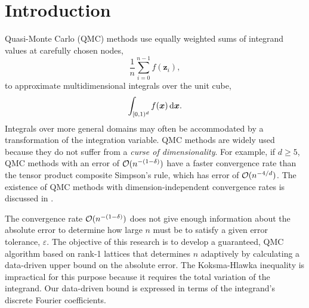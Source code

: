 \documentclass[graybox]{svmult}
\newcommand{\bsx}{\boldsymbol{x}}    %
\newcommand{\bsz}{\boldsymbol{z}}    %
\begin{document}

\section{Introduction}

Quasi-Monte Carlo (QMC) methods use equally weighted sums of integrand values at carefully chosen nodes,
\[
\frac 1n \sum_{i=0}^{n-1} f(\bsz_i), 
\]
to approximate multidimensional integrals over the unit cube,
\[
\int_{\cube} f(\bsx) \, \dif \bsx.
\]
Integrals over more general domains may often be accommodated by a transformation of the integration variable. QMC methods are widely used because they do not suffer from a \textit{curse of dimensionality}. For example, if $d \ge 5$, QMC methods with an error of $\mathcal{O}(n^{-(1-\delta)})$ have a faster convergence rate than the tensor product composite Simpson's rule, which has error of $\mathcal{O}(n^{-4/d})$. The existence of QMC methods with dimension-independent convergence rates is discussed in \cite[Ch.\ 10--12]{NovWoz10a}.

The convergence rate $\mathcal{O}(n^{-(1-\delta)})$ does not give enough information about the absolute error to determine how large $n$ must be to satisfy a given error tolerance, $\varepsilon$. The objective of this research is to develop a guaranteed, QMC algorithm based on rank-1 lattices that determines $n$ adaptively by calculating a data-driven upper bound on the absolute error. The Koksma-Hlawka inequality is impractical for this purpose because it requires the total variation of the integrand. Our data-driven bound is expressed in terms of the integrand's discrete Fourier coefficients. 
\end{document}
